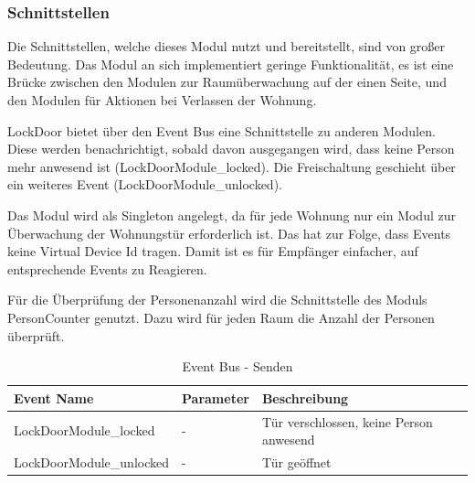 \subsubsection{Schnittstellen}
Die Schnittstellen, welche dieses Modul nutzt und bereitstellt, sind von großer Bedeutung. Das Modul an sich implementiert geringe Funktionalität, es ist eine Brücke zwischen den Modulen zur Raumüberwachung auf der einen Seite, und den Modulen für Aktionen bei Verlassen der Wohnung.

LockDoor bietet über den Event Bus eine Schnittstelle zu anderen Modulen. Diese werden benachrichtigt, sobald davon ausgegangen wird, dass keine Person mehr anwesend ist (LockDoorModule\_locked). Die Freischaltung geschieht über ein weiteres Event (LockDoorModule\_unlocked).

Das Modul wird als Singleton angelegt, da für jede Wohnung nur ein Modul zur Überwachung der Wohnungstür erforderlich ist. Das hat zur Folge, dass Events keine Virtual Device Id tragen. Damit ist es für Empfänger einfacher, auf entsprechende Events zu Reagieren.

Für die Überprüfung der Personenanzahl wird die Schnittstelle des Moduls PersonCounter genutzt. Dazu wird für jeden Raum die Anzahl der Personen überprüft.



\begin{table}
\begin{tabularx}{\textwidth}{
		 >{\hsize=1.25\hsize}X %
		>{\hsize=0.5\hsize\centering}X %
		>{\hsize=1.25\hsize}X %
	}	
	\hline
	\textbf{Event Name}					& \textbf{Parameter}	& \textbf{Beschreibung} \\
	\hline LockDoorModule\_locked		& - 					& Tür verschlossen, keine Person anwesend \\ 
	\hline LockDoorModule\_unlocked		& - 			 		& Tür geöffnet \\ 
	\hline
\end{tabularx}
\caption{Event Bus - Senden}
\end{table}


